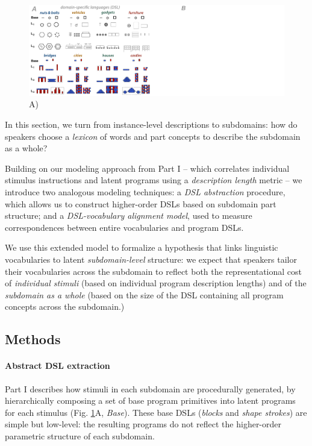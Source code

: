 \documentclass[10pt,letterpaper]{article}
\begin{document}
\begin{figure}[!ht]
  \begin{center}
  \includegraphics[width=0.98\linewidth]{figures/lax_libraries.pdf}
  \caption{A) }
  \label{fig:library_gallery}
  \end{center}
\end{figure}
In this section, we turn from instance-level descriptions to subdomains: how do speakers choose a \textit{lexicon} of words and part concepts to describe the subdomain as a whole?

Building on our modeling approach from Part I -- which correlates individual stimulus instructions and latent programs using a \textit{description length} metric -- we introduce two analogous modeling techniques: a \textit{DSL abstraction} procedure, which allows us to construct higher-order DSLs based on subdomain part structure; and a \textit{DSL-vocabulary alignment model}, used to measure correspondences between entire vocabularies and program DSLs.

We use this extended model to formalize a hypothesis that links linguistic vocabularies to latent \textit{subdomain-level} structure: we expect that speakers tailor their vocabularies across the subdomain to reflect both the representational cost of \textit{individual stimuli} (based on individual program description lengths) and of the \textit{subdomain as a whole} (based on the size of the DSL containing all program concepts across the subdomain.)

\subsection{Methods}
\paragraph{Abstract DSL extraction} 
Part I describes how stimuli in each subdomain are procedurally generated, by hierarchically composing a set of base program primitives into latent programs for each stimulus (Fig. \ref{fig:library_gallery}A, \textit{Base}). These base DSLs (\textit{blocks} and \textit{shape strokes}) are simple but low-level: the resulting programs do not reflect the higher-order parametric structure of each subdomain.
\end{document}
